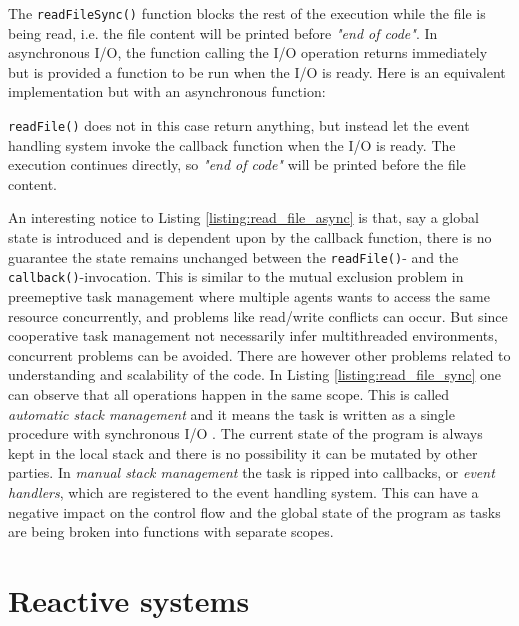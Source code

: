

The \lstinline{readFileSync()} function blocks the rest of the execution while
the file is being read, i.e. the file content will be printed before
\textit{"end of code"}. In asynchronous I/O, the function calling the I/O
operation returns immediately but is provided a function to be run when the I/O
is ready. Here is an equivalent implementation but with an asynchronous
function:



\lstinline{readFile()} does not in this case return anything, but instead let
the event handling system invoke the callback function when the I/O is ready.
The execution continues directly, so \textit{"end of code"} will be printed
before the file content.

An interesting notice to Listing \ref{listing:read_file_async} is that, say a
global state is introduced and is dependent upon by the callback function,
there is no guarantee the state remains unchanged between the
\lstinline{readFile()}- and the \lstinline{callback()}-invocation. This is
similar to the mutual exclusion problem in preemeptive task management where
multiple agents wants to access the same resource concurrently, and problems
like read/write conflicts can occur. But since cooperative task management not
necessarily infer multithreaded environments, concurrent problems can be
avoided. There are however other problems related to understanding and
scalability of the code. In Listing \ref{listing:read_file_sync} one can
observe that all operations happen in the same scope. This is called
\textit{automatic stack management} and it means the task is written as a
single procedure with synchronous I/O \cite{adya2002cooperative}. The current
state of the program is always kept in the local stack and there is no
possibility it can be mutated by other parties. In \textit{manual stack
management} the task is ripped into callbacks, or \textit{event handlers},
which are registered to the event handling system. This can have a negative
impact on the control flow and the global state of the program as tasks are
being broken into functions with separate scopes.

\section{Reactive systems}

